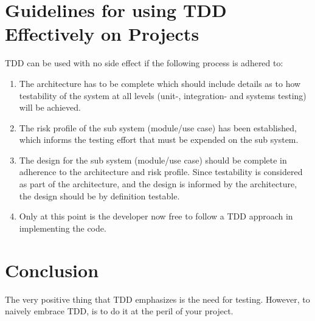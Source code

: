 \documentclass{amsart}
\begin{document}
  
  \section{Guidelines for using TDD Effectively on Projects}
  TDD can be used with no side effect if the following process is adhered to:
  \begin{enumerate}
  \item The architecture has to be complete which should include details as to how testability of the system at all levels (unit-, integration- and systems testing) will be achieved.
  \item The risk profile of the sub system (module/use case) has been established, which informs the testing effort that must be expended on the sub system.
  \item The design for the sub system (module/use case) should be complete in adherence to the architecture and risk profile. Since testability is considered as part of the architecture, and the design is informed by the architecture, the design should be by definition testable.
  \item Only at this point is the developer now free to follow a TDD approach in implementing the code.
  \end{enumerate}
  
  \section{Conclusion}
  The very positive thing that TDD emphasizes is the need for testing. However, to naively embrace TDD, is to do it at the peril of your project.



  
  
  
 
\end{document}
